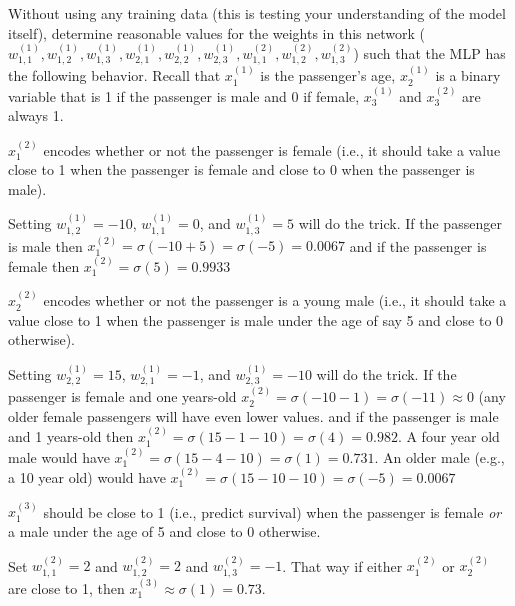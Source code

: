 \documentclass[assignment06_Solutions]{subfiles}
\begin{document}
\begin{exercise}[(30 minutes)]
Without using any training data (this is testing your understanding of the model itself), determine reasonable values for the weights in this network ($w^{(1)}_{1,1}, w^{(1)}_{1,2}, w^{(1)}_{1,3}, w^{(1)}_{2,1}, w^{(1)}_{2,2}, w^{(1)}_{2,3}, w^{(2)}_{1,1}, w^{(2)}_{1,2}, w^{(2)}_{1,3}$) such that the MLP has the following behavior.  Recall that $x^{(1)}_1$ is the passenger's age, $x^{(1)}_2$ is a binary variable that is 1 if the passenger is male and 0 if female, $x^{(1)}_3$ and $x^{(2)}_3$ are always 1.
\bes
\item $x^{(2)}_1$ encodes whether or not the passenger is female (i.e., it should take a value close to 1 when the passenger is female and close to 0 when the passenger is male).
\begin{boxedsolution}
Setting $w^{(1)}_{1,2} = -10$, $w^{(1)}_{1,1} = 0$, and $w^{(1)}_{1,3} = 5$ will do the trick.  If the passenger is male then $x^{(2)}_1 = \sigma(-10 + 5) = \sigma(-5) = 0.0067$ and if the passenger is female then $x^{(2)}_1 = \sigma(5) = 0.9933$
\end{boxedsolution}
\item $x^{(2)}_2$ encodes whether or not the passenger is a young male (i.e., it should take a value close to 1 when the passenger is male under the age of say 5 and close to 0 otherwise).
\begin{boxedsolution}
Setting $w^{(1)}_{2,2} = 15$, $w^{(1)}_{2,1} = -1$, and $w^{(1)}_{2,3} = -10$ will do the trick.  If the passenger is female and one years-old $x^{(2)}_2 = \sigma(-10 - 1) = \sigma(-11) \approx 0$ (any older female passengers will have even lower values. and if the passenger is male and 1 years-old then $x^{(2)}_1 = \sigma(15 - 1 - 10) = \sigma(4) = 0.982$.  A four year old male would have $x^{(2)}_1 = \sigma(15 - 4 - 10) = \sigma(1) = 0.731$.  An older male (e.g., a 10 year old) would have $x^{(2)}_1 = \sigma(15 - 10 - 10) = \sigma(-5) = 0.0067$
\end{boxedsolution}
\item $x^{(3)}_1$ should be close to 1 (i.e., predict survival) when the passenger is female \emph{or} a male under the age of 5 and close to 0 otherwise.
\begin{boxedsolution}
Set $w^{(2)}_{1,1} = 2$ and $w^{(2)}_{1,2} = 2$ and $w^{(2)}_{1,3} = -1$.  That way if either $x^{(2)}_1$ or $x^{(2)}_2$ are close to 1, then $x^{(3)}_1 \approx \sigma(1) = 0.73$.
\end{boxedsolution}
\ees
\end{exercise}
\end{document}
